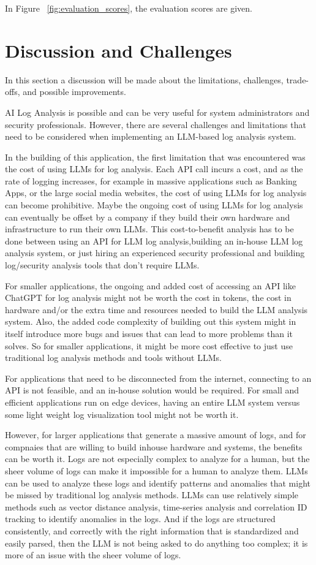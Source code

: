 \documentclass[sigconf]{acmart}
\begin{document}
In Figure ~\ref{fig:evaluation_scores}, the evaluation scores are given.


\section{Discussion and Challenges}

In this section a discussion will be made about the limitations, challenges, trade-offs, and possible improvements. 

AI Log Analysis is possible and can be very useful for system administrators and security professionals. However, there are several challenges and limitations that need to be considered when implementing an LLM-based log analysis system.

In the building of this application, the first limitation that was encountered was the cost of using LLMs for log analysis. Each API call incurs a cost, and as the rate of logging increases, for example in massive applications such as Banking Apps, or the large social media websites, the cost of using LLMs for log analysis can become prohibitive. Maybe the ongoing cost of using LLMs for log analysis can eventually be offset by a company if they build their own hardware and infrastructure to run their own LLMs. This cost-to-benefit analysis has to be done between using an API for LLM log analysis,building an in-house LLM log analysis system, or just hiring an experienced security professional and building log/security analysis tools that don't require LLMs.

For smaller applications, the ongoing and added cost of accessing an API like ChatGPT for log analysis might not be worth the cost in tokens, the cost in hardware and/or the extra time and resources needed to build the LLM analysis system. Also, the added code complexity of building out this system might in itself introduce more bugs and issues that can lead to more problems than it solves. So for smaller applications, it might be more cost effective to just use traditional log analysis methods and tools without LLMs.

For applications that need to be disconnected from the internet, connecting to an API is not feasible, and an in-house solution would be required. For small and efficient applications run on edge devices, having an entire LLM system versus some light weight log visualization tool might not be worth it. 

However, for larger applications that generate a massive amount of logs, and for compnaies that are willing to build inhouse hardware and systems, the benefits can be worth it. Logs are not especially complex to analyze for a human, but the sheer volume of logs can make it impossible for a human to analyze them. LLMs can be used to analyze these logs and identify patterns and anomalies that might be missed by traditional log analysis methods. LLMs can use relatively simple methods such as vector distance analysis, time-series analysis and correlation ID tracking to identify anomalies in the logs. And if the logs are structured consistently, and correctly with the right information that is standardized and easily parsed, then the LLM is not being asked to do anything too complex; it is more of an issue with the sheer volume of logs.
\end{document}
